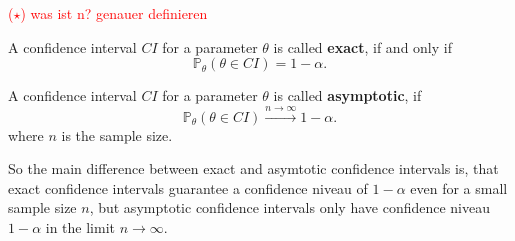 \textcolor{red}{($\star$) was ist n? genauer definieren}

\begin{definition}
	A confidence interval $CI$ for a parameter $\theta$ is called \textbf{exact}, if and only if
	\[
		\mathbb{P}_{\theta} \left( \theta \in CI \right) = 1 - \alpha.
	\]
\end{definition}

\begin{definition}
	A confidence interval $CI$ for a parameter $\theta$ is called \textbf{asymptotic}, if
	\[
	\mathbb{P}_{\theta} \left( \theta \in CI \right) \overset{n \to \infty}{\longrightarrow} 1 - \alpha.
	\]
	where $n$ is the sample size.
\end{definition}

So the main difference between exact and asymtotic confidence intervals is, that exact confidence intervals guarantee a confidence niveau of $1 - \alpha$ even for a small sample size $n$, but asymptotic confidence intervals only have confidence niveau $1 - \alpha$ in the limit $n \to \infty$.

	

